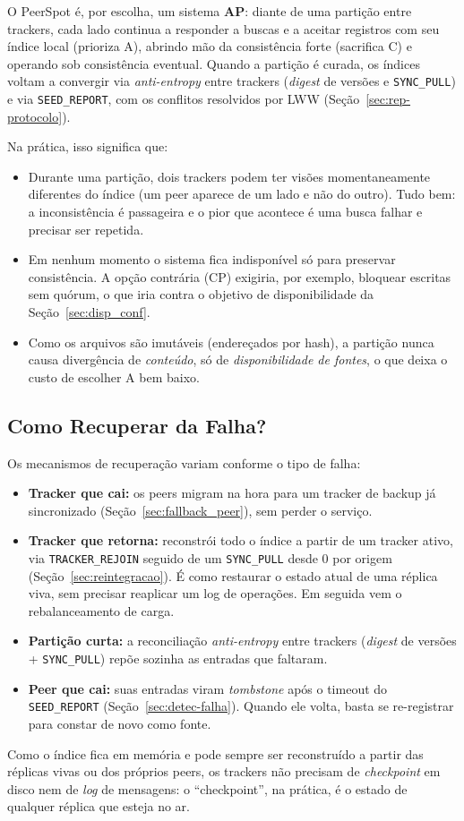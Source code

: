 \documentclass[12pt, a4paper]{article}
\begin{document}
O PeerSpot é, por escolha, um sistema \textbf{AP}: diante de uma partição entre trackers, cada lado continua a responder a buscas e a aceitar registros com seu índice local (prioriza A), abrindo mão da consistência forte (sacrifica C) e operando sob consistência eventual. Quando a partição é curada, os índices voltam a convergir via \textit{anti-entropy} entre trackers (\textit{digest} de versões e \texttt{SYNC\_PULL}) e via \texttt{SEED\_REPORT}, com os conflitos resolvidos por LWW (Seção~\ref{sec:rep-protocolo}).

Na prática, isso significa que:
\begin{itemize}
    \item Durante uma partição, dois trackers podem ter visões momentaneamente diferentes do índice (um peer aparece de um lado e não do outro). Tudo bem: a inconsistência é passageira e o pior que acontece é uma busca falhar e precisar ser repetida.
    \item Em nenhum momento o sistema fica indisponível só para preservar consistência. A opção contrária (CP) exigiria, por exemplo, bloquear escritas sem quórum, o que iria contra o objetivo de disponibilidade da Seção~\ref{sec:disp_conf}.
    \item Como os arquivos são imutáveis (endereçados por hash), a partição nunca causa divergência de \textit{conteúdo}, só de \textit{disponibilidade de fontes}, o que deixa o custo de escolher A bem baixo.
\end{itemize}

\subsection{Como Recuperar da Falha?}

Os mecanismos de recuperação variam conforme o tipo de falha:

\begin{itemize}
    \item \textbf{Tracker que cai:} os peers migram na hora para um tracker de backup já sincronizado (Seção~\ref{sec:fallback_peer}), sem perder o serviço.
    \item \textbf{Tracker que retorna:} reconstrói todo o índice a partir de um tracker ativo, via \texttt{TRACKER\_REJOIN} seguido de um \texttt{SYNC\_PULL} desde 0 por origem (Seção~\ref{sec:reintegracao}). É como restaurar o estado atual de uma réplica viva, sem precisar reaplicar um log de operações. Em seguida vem o rebalanceamento de carga.
    \item \textbf{Partição curta:} a reconciliação \textit{anti-entropy} entre trackers (\textit{digest} de versões + \texttt{SYNC\_PULL}) repõe sozinha as entradas que faltaram.
    \item \textbf{Peer que cai:} suas entradas viram \textit{tombstone} após o timeout do \texttt{SEED\_REPORT} (Seção~\ref{sec:detec-falha}). Quando ele volta, basta se re-registrar para constar de novo como fonte.
\end{itemize}

Como o índice fica em memória e pode sempre ser reconstruído a partir das réplicas vivas ou dos próprios peers, os trackers não precisam de \textit{checkpoint} em disco nem de \textit{log} de mensagens: o ``checkpoint'', na prática, é o estado de qualquer réplica que esteja no ar.
\end{document}
